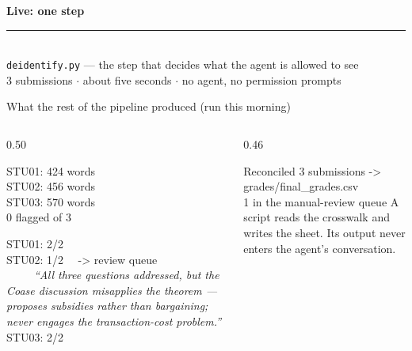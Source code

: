 {
\begin{frame}[plain]
\centering\vfill
{\fontsize{20}{26}\bfseries\selectfont\color{white} \faTerminal\quad Live: one step}\\[10pt]
{\color{UVMGold}\rule{6cm}{0.8pt}}\\[10pt]
{\normalsize\color{PaleSage} \texttt{deidentify.py} --- the step that decides what the agent is allowed to see}\\[4pt]
{\small\color{CoolGray} 3 submissions \;$\cdot$\; about five seconds \;$\cdot$\; no agent, no permission prompts}
\vfill
\end{frame}
}

\begin{frame}{What the rest of the pipeline produced (run this morning)}
\vskip-6pt
\begin{columns}[T]
\begin{column}{0.50\textwidth}
\begin{tcolorbox}[pipelinebox, title={\faListOl\quad count\_words.py --- the deterministic gate}, top=2pt, bottom=2pt]
\scriptsize\ttfamily
STU01: 424 words\\
STU02: 456 words\\
STU03: 570 words\\
0 flagged of 3
\end{tcolorbox}
\vskip3pt
\begin{tcolorbox}[pipelinebox, title={\faBrain\quad grade.py --- the agent, on anonymous text only}, top=2pt, bottom=2pt]
\scriptsize\ttfamily
STU01: 2/2\\
STU02: 1/2 \ \ -> review queue\\
\ \ \ \ \ \textrm{\itshape ``All three questions addressed, but the Coase discussion misapplies the theorem --- proposes subsidies rather than bargaining; never engages the transaction-cost problem.''}\\
STU03: 2/2
\end{tcolorbox}
\end{column}
\begin{column}{0.46\textwidth}
\begin{tcolorbox}[pipelinebox, title={\faFileCsv\quad reconcile.py --- names go back on}, top=2pt, bottom=2pt]
\scriptsize\ttfamily
Reconciled 3 submissions -> grades/final\_grades.csv\\
1 in the manual-review queue
\vskip3pt
\textrm{\scriptsize A script reads the crosswalk and writes the sheet. Its output never enters the agent's conversation.}

\end{tcolorbox}
\end{column}
\end{columns}
\end{frame}
